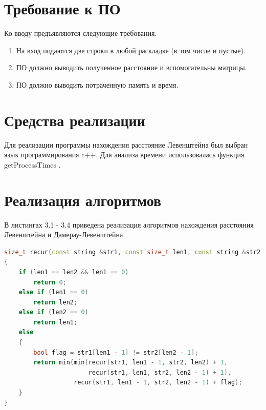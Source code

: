 \documentclass[12pt]{report}
\begin{document}
\section{Требование к ПО}
Ко вводу предъявляются следующие требования.
\begin{enumerate}
	\item На вход подаются две строки в любой раскладке (в том числе и пустые).
	\item ПО должно выводить полученное расстояние и вспомогательны матрицы.
	\item ПО должно выводить потраченную память и время.
\end{enumerate}

\section{Средства реализации}
Для реализации программы нахождения расстояние Левенштейна был выбран язык программирования c++. Для анализа времени использовалась функция getProcessTimes \cite{bibGetProcessTimes}.

\section{Реализация алгоритмов}

В листингах 3.1 - 3.4 приведена реализация алгоритмов нахождения расстояния Левенштейна и Дамерау-Левенштейна.

\begin{lstlisting}[label=some-code,caption=Функция нахождения расстояния Левенштейна рекурсивно,language=C++]
size_t recur(const string &str1, const size_t len1, const string &str2, const size_t len2)
{
    if (len1 == len2 && len1 == 0)
        return 0;
    else if (len1 == 0)
        return len2;
    else if (len2 == 0)
        return len1;
    else
    {
        bool flag = str1[len1 - 1] != str2[len2 - 1];
        return min(min(recur(str1, len1 - 1, str2, len2) + 1,
                       recur(str1, len1, str2, len2 - 1) + 1),
                   recur(str1, len1 - 1, str2, len2 - 1) + flag);
    }
}
\end{lstlisting}
\end{document}
